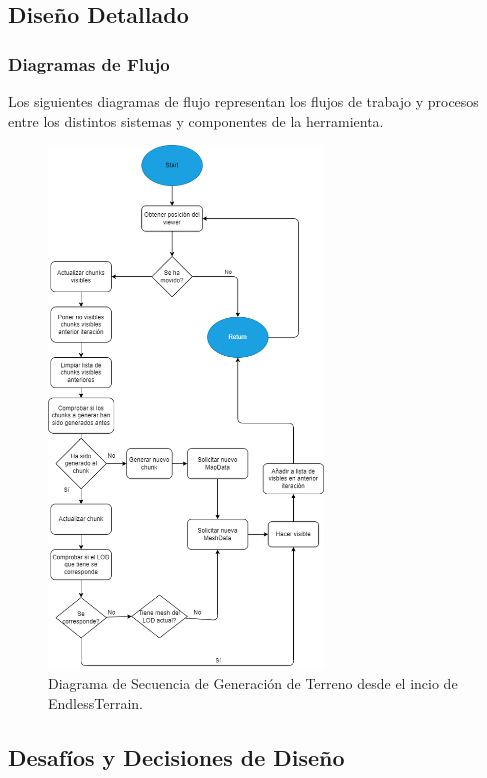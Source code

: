 \subsection{Diseño Detallado}

\subsubsection{Diagramas de Flujo}
Los siguientes diagramas de flujo representan los flujos de trabajo y procesos entre los distintos sistemas y componentes de la herramienta.

\begin{figure}[H]
    \centering
    \includegraphics[width=0.65\textwidth]{img/FlowDiagramEndlessTerrain.png}
    \caption{Diagrama de Secuencia de Generación de Terreno desde el incio de EndlessTerrain.}
\end{figure}
\newpage

\subsection{Desafíos y Decisiones de Diseño}

